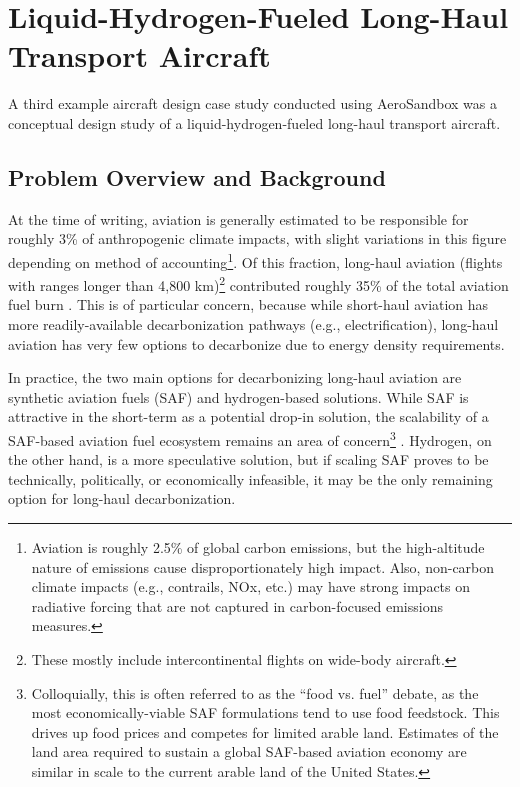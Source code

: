 \section{Liquid-Hydrogen-Fueled Long-Haul Transport Aircraft}
\label{sec:hydrogen}

A third example aircraft design case study conducted using AeroSandbox was a conceptual design study of a liquid-hydrogen-fueled long-haul transport aircraft.

\subsection{Problem Overview and Background}

At the time of writing, aviation is generally estimated to be responsible for roughly 3\% of anthropogenic climate impacts, with slight variations in this figure depending on method of accounting\footnote{Aviation is roughly 2.5\% of global carbon emissions, but the high-altitude nature of emissions cause disproportionately high impact. Also, non-carbon climate impacts (e.g., contrails, NOx, etc.) may have strong impacts on radiative forcing that are not captured in carbon-focused emissions measures.}. Of this fraction, long-haul aviation (flights with ranges longer than 4,800 km)\footnote{These mostly include intercontinental flights on wide-body aircraft.} contributed roughly 35\% of the total aviation fuel burn \cite{yutko}. This is of particular concern, because while short-haul aviation has more readily-available decarbonization pathways (e.g., electrification), long-haul aviation has very few options to decarbonize due to energy density requirements.

In practice, the two main options for decarbonizing long-haul aviation are synthetic aviation fuels (SAF) and hydrogen-based solutions. While SAF is attractive in the short-term as a potential drop-in solution, the scalability of a SAF-based aviation fuel ecosystem remains an area of concern\footnote{Colloquially, this is often referred to as the ``food vs. fuel'' debate, as the most economically-viable SAF formulations tend to use food feedstock. This drives up food prices and competes for limited arable land. Estimates of the land area required to sustain a global SAF-based aviation economy are similar in scale to the current arable land of the United States.} \cite{waypoint2050, gaubatz_estimating_2023}. Hydrogen, on the other hand, is a more speculative solution, but if scaling SAF proves to be technically, politically, or economically infeasible, it may be the only remaining option for long-haul decarbonization.

